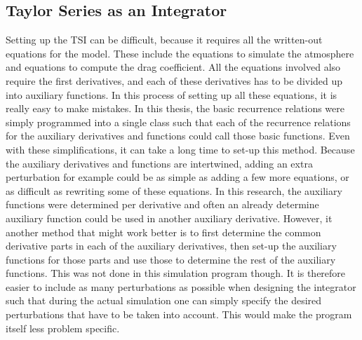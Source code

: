 \subsection{Taylor Series as an Integrator}
\label{subsec:taylorSeriesAsAnIntegrator}
Setting up the \ac{TSI} can be difficult, because it requires all the written-out equations for the model. These include the equations to simulate the atmosphere and equations to compute the drag coefficient. All the equations involved also require the first derivatives, and each of these derivatives has to be divided up into auxiliary functions. In this process of setting up all these equations, it is really easy to make mistakes. In this thesis, the basic recurrence relations were simply programmed into a single class such that each of the recurrence relations for the auxiliary derivatives and functions could call those basic functions. Even with these simplifications, it can take a long time to set-up this method. Because the auxiliary derivatives and functions are intertwined, adding an extra perturbation for example could be as simple as adding a few more equations, or as difficult as rewriting some of these equations. In this research, the auxiliary functions were determined per derivative and often an already determine auxiliary function could be used in another auxiliary derivative. However, it another method that might work better is to first determine the common derivative parts in each of the auxiliary derivatives, then set-up the auxiliary functions for those parts and use those to determine the rest of the auxiliary functions. This was not done in this simulation program though. It is therefore easier to include as many perturbations as possible when designing the integrator such that during the actual simulation one can simply specify the desired perturbations that have to be taken into account. This would make the program itself less problem specific. \\

